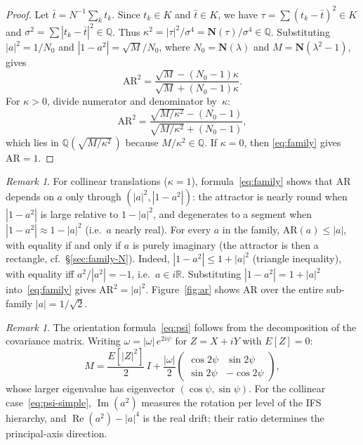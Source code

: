 \documentclass{amsart}
\theoremstyle{definition}
\theoremstyle{remark}
\newtheorem{remark}[theorem]{Remark}
\begin{document}
\begin{proof}
Let $\bar t = N^{-1}\sum_k t_k$.  Since $t_k\in K$ and $\bar t\in K$,
we have $\tau = \sum(t_k-\bar t)^2 \in K$ and
$\sigma^2 = \sum |t_k-\bar t|^2 \in \mathbb{Q}$.
Thus $\kappa^2 = |\tau|^2/\sigma^4 = \mathbf{N}(\tau)/\sigma^4\in\mathbb{Q}$.
Substituting $|a|^2=1/N_0$ and
$|1-a^2|=\sqrt{M}/N_0$, where
$N_0=\mathbf{N}(\lambda)$ and $M=\mathbf{N}(\lambda^2-1)$, gives
\[
  \mathrm{AR}^2
  = \frac{\sqrt{M}-(N_0-1)\kappa}
         {\sqrt{M}+(N_0-1)\kappa}.
\]
For $\kappa>0$, divide numerator and denominator by~$\kappa$:
\[
  \mathrm{AR}^2
  = \frac{\sqrt{M/\kappa^2}-(N_0-1)}
         {\sqrt{M/\kappa^2}+(N_0-1)},
\]
which lies in $\mathbb{Q}(\sqrt{M/\kappa^2}\,)$ because
$M/\kappa^2\in\mathbb{Q}$.  If $\kappa=0$, then
\eqref{eq:family} gives $\mathrm{AR}=1$.
\end{proof}

\begin{remark}
For collinear translations ($\kappa=1$),
formula~\eqref{eq:family} shows that $\mathrm{AR}$ depends on $a$ only
through $(|a|^2, |1-a^2|)$: the attractor is nearly round when $|1-a^2|$
is large relative to $1-|a|^2$, and degenerates to a segment when
$|1-a^2|\approx 1-|a|^2$ (i.e.\ $a$ nearly real).
For every $a$ in the family, $\mathrm{AR}(a) \leq |a|$, with equality
if and only if $a$ is purely imaginary
(the attractor is then a rectangle, cf.\ \S\ref{sec:family-N}).
Indeed, $|1-a^2| \leq 1+|a|^2$ (triangle inequality), with equality iff
$a^2/|a^2|=-1$, i.e.\ $a\in i\mathbb{R}$.
Substituting $|1-a^2|=1+|a|^2$ into~\eqref{eq:family} gives
$\mathrm{AR}^2 = |a|^2$.
Figure~\ref{fig:ar} shows $\mathrm{AR}$ over the entire sub-family $|a|=1/\sqrt{2}$.
\end{remark}

\begin{remark}\label{rem:orientation}
The orientation formula~\eqref{eq:psi} follows from the decomposition
of the covariance matrix.  Writing $\omega = |\omega|\, e^{2i\psi}$
for $Z = X + iY$ with $E[Z]=0$:
\[
  M = \frac{E[|Z|^2]}{2}\,I
    + \frac{|\omega|}{2}
      \begin{pmatrix}\cos 2\psi & \sin 2\psi \\ \sin 2\psi & -\cos 2\psi\end{pmatrix},
\]
whose larger eigenvalue has eigenvector $(\cos\psi, \sin\psi)$.
For the collinear case~\eqref{eq:psi-simple},
$\operatorname{Im}(a^2)$ measures the rotation per level of the
IFS hierarchy, and $\operatorname{Re}(a^2)-|a|^4$ is the real drift;
their ratio determines the principal-axis direction.
\end{remark}
\end{document}
